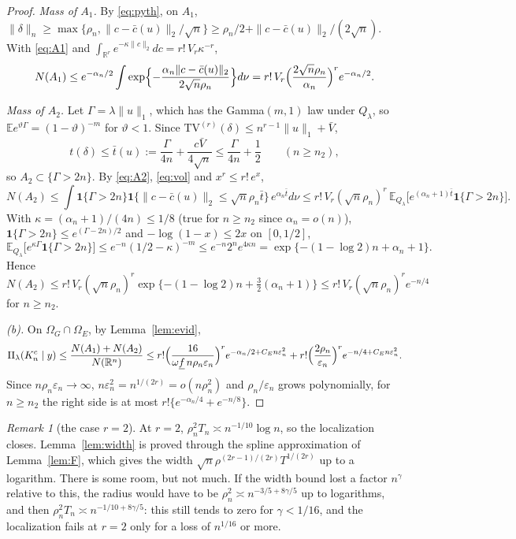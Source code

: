 \documentclass[11pt]{article}
\theoremstyle{definition}
\theoremstyle{remark}
\newtheorem{remark}{Remark}
\newcommand{\R}{\mathbb{R}}
\newcommand{\E}{\mathbb{E}}
\newcommand{\TV}{\mathrm{TV}}
\newcommand{\om}{\omega}
\newcommand{\en}{\varepsilon_n}
\newcommand{\Ql}{Q_\lambda}
\newcommand{\fl}{\underline f}
\newcommand{\Vb}{\bar V}
\newcommand{\nn}[1]{\|#1\|_n}
\newcommand{\ind}{\mathbf 1}
\begin{document}
\begin{proof}
\emph{Mass of $A_1$.} By \eqref{eq:pyth}, on $A_1$, $\nn{\delta}\ge\max\{\rho_n,\|c-\bar c(u)\|_2/\sqrt n\}\ge\rho_n/2+\|c-\bar c(u)\|_2/(2\sqrt n)$. With \eqref{eq:A1} and $\int_{\R^r}e^{-\kappa\|c\|_2}dc=r!\,V_r\kappa^{-r}$,
\[
N(A_1)\le e^{-\alpha_n/2}\int\exp\Bigl\{-\frac{\alpha_n\|c-\bar c(u)\|_2}{2\sqrt n\rho_n}\Bigr\}d\nu=r!\,V_r\Bigl(\frac{2\sqrt n\rho_n}{\alpha_n}\Bigr)^re^{-\alpha_n/2}.
\]

\emph{Mass of $A_2$.} Let $\Gamma=\lambda\|u\|_1$, which has the Gamma$(m,1)$ law under $\Ql$, so $\E e^{\vartheta\Gamma}=(1-\vartheta)^{-m}$ for $\vartheta<1$. Since $\TV^{(r)}(\delta)\le n^{r-1}\|u\|_1+\Vb$,
\[
t(\delta)\le\bar t(u):=\frac\Gamma{4n}+\frac{c\Vb}{4\sqrt n}\le\frac\Gamma{4n}+\frac12\qquad(n\ge n_2),
\]
so $A_2\subset\{\Gamma>2n\}$. By \eqref{eq:A2}, \eqref{eq:vol} and $x^r\le r!\,e^x$,
\[
N(A_2)\le\int\ind\{\Gamma>2n\}\ind\{\|c-\bar c(u)\|_2\le\sqrt n\rho_n\bar t\}\,e^{\alpha_n\bar t}d\nu\le r!\,V_r(\sqrt n\rho_n)^r\,\E_{\Ql}\bigl[e^{(\alpha_n+1)\bar t}\ind\{\Gamma>2n\}\bigr].
\]
With $\kappa=(\alpha_n+1)/(4n)\le1/8$ (true for $n\ge n_2$ since $\alpha_n=o(n)$), $\ind\{\Gamma>2n\}\le e^{(\Gamma-2n)/2}$ and $-\log(1-x)\le2x$ on $[0,1/2]$,
\[
\E_{\Ql}\bigl[e^{\kappa\Gamma}\ind\{\Gamma>2n\}\bigr]\le e^{-n}(1/2-\kappa)^{-m}\le e^{-n}2^ne^{4\kappa n}=\exp\{-(1-\log2)n+\alpha_n+1\}.
\]
Hence $N(A_2)\le r!\,V_r(\sqrt n\rho_n)^r\exp\{-(1-\log2)n+\tfrac32(\alpha_n+1)\}\le r!\,V_r(\sqrt n\rho_n)^re^{-n/4}$ for $n\ge n_2$.

\emph{(b).} On $\Omega_G\cap\Omega_E$, by Lemma~\ref{lem:evid},
\[
\Pi_\lambda(K_n^c\mid y)\le\frac{N(A_1)+N(A_2)}{N(\R^n)}\le r!\Bigl(\frac{16}{\om\fl\,n\rho_n\en}\Bigr)^re^{-\alpha_n/2+C_En\en^2}+r!\Bigl(\frac{2\rho_n}{\en}\Bigr)^re^{-n/4+C_En\en^2}.
\]
Since $n\rho_n\en\to\infty$, $n\en^2=n^{1/(2r)}=o(n\rho_n^2)$ and $\rho_n/\en$ grows polynomially, for $n\ge n_2$ the right side is at most $r!\{e^{-\alpha_n/4}+e^{-n/8}\}$.
\end{proof}

\begin{remark}[the case $r=2$]\label{rem:r2}
At $r=2$, $\rho_n^{2}T_n\asymp n^{-1/10}\log n$, so the localization closes. Lemma~\ref{lem:width} is proved through the spline approximation of Lemma~\ref{lem:F}, which gives the width $\sqrt n\rho^{(2r-1)/(2r)}T^{1/(2r)}$ up to a logarithm. There is some room, but not much. If the width bound lost a factor $n^{\gamma}$ relative to this, the radius would have to be $\rho_n^2\asymp n^{-3/5+8\gamma/5}$ up to logarithms, and then $\rho_n^2T_n\asymp n^{-1/10+8\gamma/5}$: this still tends to zero for $\gamma<1/16$, and the localization fails at $r=2$ only for a loss of $n^{1/16}$ or more.
\end{remark}
\end{document}
